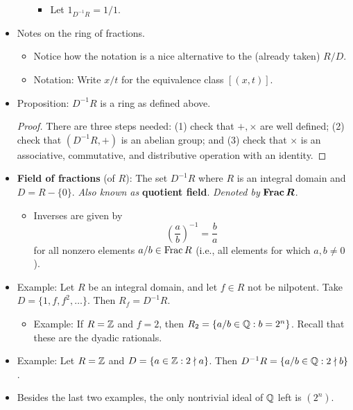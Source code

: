 \documentclass[../notes.tex]{subfiles}
\begin{document}
\begin{itemize}
\begin{enumerate}
\begin{equation*}
        \end{equation*}
        \begin{itemize}
            \item Let $1_{D^{-1}R}=1/1$.
        \end{itemize}
    \end{enumerate}
    \item Notes on the ring of fractions.
    \begin{itemize}
        \item Notice how the notation is a nice alternative to the (already taken) $R/D$.
        \item Notation: Write $x/t$ for the equivalence class $[(x,t)]$.
    \end{itemize}
    \item Proposition: $D^{-1}R$ is a ring as defined above.
    \begin{proof}
        There are three steps needed: (1) check that $+,\times$ are well defined; (2) check that $(D^{-1}R,+)$ is an abelian group; and (3) check that $\times$ is an associative, commutative, and distributive operation with an identity.
    \end{proof}
    \item \textbf{Field of fractions} (of $R$): The set $D^{-1}R$ where $R$ is an integral domain and $D=R-\{0\}$. \emph{Also known as} \textbf{quotient field}. \emph{Denoted by} $\bm{\Frac R}$.
    \begin{itemize}
        \item Inverses are given by
        \begin{equation*}
            \left( \frac{a}{b} \right)^{-1} = \frac{b}{a}
        \end{equation*}
        for all nonzero elements $a/b\in\operatorname{Frac} R$ (i.e., all elements for which $a,b\neq 0$).
    \end{itemize}
    \item Example: Let $R$ be an integral domain, and let $f\in R$ not be nilpotent. Take $D=\{1,f,f^2,\dots\}$. Then $R_f=D^{-1}R$.
    \begin{itemize}
        \item Example: If $R=\mathbb{Z}$ and $f=2$, then $R_2=\{a/b\in\mathbb{Q}:b=2^n\}$. Recall that these are the dyadic rationals.
    \end{itemize}
    \item Example: Let $R=\mathbb{Z}$ and $D=\{a\in\mathbb{Z}:2\nmid a\}$. Then $D^{-1}R=\{a/b\in\mathbb{Q}:2\nmid b\}$.
    \item Besides the last two examples, the only nontrivial ideal of $\mathbb{Q}$ left is $(2^n)$.

\end{itemize}
\end{document}
